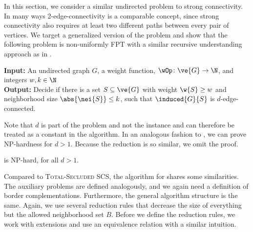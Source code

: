 
In this section, we consider a similar undirected problem to strong connectivity. In many ways 2-edge-connectivity is a comparable concept, since strong connectivity also requires at least two different paths between every pair of vertices. We target a generalized version of the problem and show that the following problem is non-uniformly FPT with a similar recursive understanding approach as in .

\begin{tcolorbox}[enhanced,title={\color{black} {\textsc{Secluded $d$-Edge-Connected Subgraph}$~$ (\prob{})}}, colback=white, boxrule=0.4pt,
	attach boxed title to top left={xshift=.3cm, yshift*=-2.5mm},
	boxed title style={size=small,frame hidden,colback=white}]
	
	\textbf{Input:}  
  An undirected graph $G$, a weight function, $\wOp \colon \ve{G} \to \N$, and integers $w, k \in \N$\\

	\textbf{Output:}
  Decide if there is a set $S \subseteq \ve{G}$ with weight $\w{S} \ge w$ and neighborhood size $\abs{\nei{S}} \le k$, such that $\induced{G}{S}$ is $d$-edge-connected.
\end{tcolorbox}

Note that $d$ is part of the problem and not the instance and can therefore be treated as a constant in the algorithm.
In an analogous fashion to , we can prove NP-hardness for $d > 1$. Because the reduction is so similar, we omit the proof.
\begin{theorem}\label{thm:d_edge_np_hard}
  \prob{} is NP-hard, for all $d > 1$.
\end{theorem}

Compared to \textsc{Total-Secluded SCS}, the algorithm for \prob{} shares some similarities. The auxiliary problems are defined analogously, and we again need a definition of border complementations. Furthermore, the general algorithm structure is the same. Again, we use several reduction rules that decrease the size of everything but the allowed neighborhood set $B$. Before we define the reduction rules, we work with extensions and use an equivalence relation with a similar intuition. 

